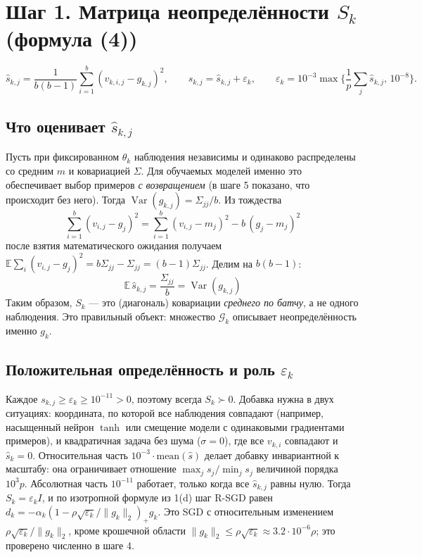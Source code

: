 \documentclass[11pt,a4paper]{article}
\newcommand{\G}{\mathcal{G}_k}
\newcommand{\norm}[1]{\lVert #1\rVert_2}
\newcommand{\E}{\mathbb{E}}
\DeclareMathOperator{\Var}{Var}
\begin{document}
\section*{Шаг 1. Матрица неопределённости $S_k$ (формула (4))}

\begin{equation*}
\widehat s_{k,j}=\frac1{b(b-1)}\sum_{i=1}^b(v_{k,i,j}-g_{k,j})^2,\qquad
s_{k,j}=\widehat s_{k,j}+\varepsilon_k,\qquad
\varepsilon_k=10^{-3}\max\Big\{\frac1p\sum_j\widehat s_{k,j},\,10^{-8}\Big\}.
\end{equation*}

\subsection*{Что оценивает $\widehat s_{k,j}$}

Пусть при фиксированном $\theta_k$ наблюдения независимы и одинаково распределены со
средним $m$ и ковариацией $\Sigma$. Для обучаемых моделей именно это обеспечивает
выбор примеров \emph{с возвращением} (в шаге 5 показано, что происходит без него).
Тогда $\Var(g_{k,j})=\Sigma_{jj}/b$. Из тождества
\begin{equation*}
\sum_{i=1}^b(v_{i,j}-g_j)^2=\sum_{i=1}^b(v_{i,j}-m_j)^2-b\,(g_j-m_j)^2
\end{equation*}
после взятия математического ожидания получаем
$\E\sum_i(v_{i,j}-g_j)^2=b\Sigma_{jj}-\Sigma_{jj}=(b-1)\Sigma_{jj}$. Делим на $b(b-1)$:
\begin{equation*}
\boxed{\;\E\,\widehat s_{k,j}=\frac{\Sigma_{jj}}b=\Var(g_{k,j})\;}
\end{equation*}
Таким образом, $S_k$ — это (диагональ) ковариации \emph{среднего по батчу}, а не
одного наблюдения. Это правильный объект: множество $\G$ описывает неопределённость
именно $g_k$.

\subsection*{Положительная определённость и роль $\varepsilon_k$}

Каждое $s_{k,j}\ge\varepsilon_k\ge10^{-11}>0$, поэтому всегда $S_k\succ0$. Добавка
нужна в двух ситуациях: координата, по которой все наблюдения совпадают (например,
насыщенный нейрон $\tanh$ или смещение модели с одинаковыми градиентами примеров), и
квадратичная задача без шума ($\sigma=0$), где все $v_{k,i}$ совпадают и
$\widehat s_k=0$. Относительная часть $10^{-3}\cdot\text{mean}(\widehat s)$ делает
добавку инвариантной к масштабу: она ограничивает отношение $\max_js_j/\min_js_j$
величиной порядка $10^3p$. Абсолютная часть $10^{-11}$ работает, только когда все
$\widehat s_{k,j}$ равны нулю. Тогда $S_k=\varepsilon_kI$, и по изотропной формуле из 1(d)
шаг R-SGD равен $d_k=-\alpha_k(1-\rho\sqrt{\varepsilon_k}/\norm{g_k})_+g_k$. Это SGD с
относительным изменением $\rho\sqrt{\varepsilon_k}/\norm{g_k}$, кроме крошечной
области $\norm{g_k}\le\rho\sqrt{\varepsilon_k}\approx3.2\cdot10^{-6}\rho$; это
проверено численно в шаге 4.
\end{document}
